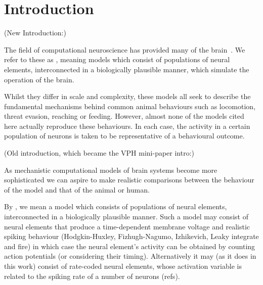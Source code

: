 \documentclass{frontiersSCNS}
\begin{document}
\section{Introduction}

(New Introduction:)

The field of computational neuroscience has provided
many  of the brain~\cite{arai_two-dimensional_1994,gancarz_neural_1998,hazy_towards_2007,blenkinsop_frequency_2017}. We
refer to these as , meaning
models which consist of populations of neural elements, interconnected
in a biologically plausible manner, which simulate the operation of
the brain.

Whilst they differ in scale and complexity, these models all seek to
describe the fundamental mechanisms behind common animal behaviours
such as locomotion, threat evasion, reaching or feeding. However,
almost none of the models cited here actually reproduce these
behaviours. In each case, the activity in a certain population of
neurons is taken to be representative of a behavioural outcome.


(Old introduction, which became the VPH mini-paper intro:)

As mechanistic computational models of brain systems become more
sophisticated we can aspire to make realistic comparisons between the
behaviour of the model and that of the animal or human.

By , we mean a model which
consists of populations of neural elements, interconnected in a
biologically plausible manner. Such a model may consist of neural
elements that produce a time-dependent membrane voltage and realistic
spiking behaviour (Hodgkin-Huxley, Fizhugh-Nagumo, Izhikevich, Leaky
integrate and fire) in which case the neural element's activity can be
obtained by counting action potentials (or considering their
timing). Alternatively it may (as it does in this work) consist of
rate-coded neural elements, whose activation variable is related to
the spiking rate of a number of neurons (refs).
\end{document}
